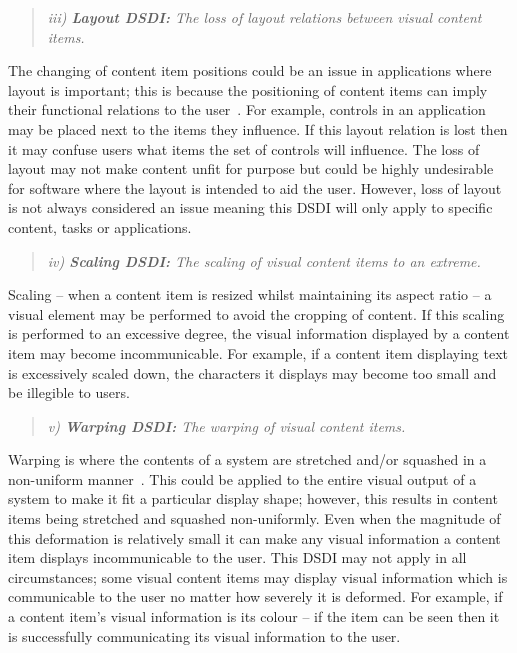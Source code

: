 \documentclass[twocolumn,compsoc]{cvm}
\begin{document}
\begin{quote}\emph{iii) \textbf{Layout \ac{DSDI}:} The loss of layout relations between visual content items.}\end{quote}

The changing of content item positions could be an issue in applications where layout is important; this is because the positioning of content items can imply their functional relations to the user~\cite{Constantine1999,mcnaughton-et-al:hcis2017}.
For example, controls in an application may be placed next to the items they influence.
If this layout relation is lost then it may confuse users what items the set of controls will influence. 
The loss of layout may not make content unfit for purpose but could be highly undesirable for software where the layout is intended to aid the user.
However, loss of layout is not always considered an issue meaning this \ac{DSDI} will only apply to specific content, tasks or applications.

\begin{quote}\emph{iv) \textbf{Scaling \ac{DSDI}:} The scaling of visual content items to an extreme.}\end{quote}

Scaling -- when a content item is resized whilst maintaining its aspect ratio -- a visual element may be performed to avoid the cropping of content.
If this scaling is performed to an excessive degree, the visual information displayed by a content item may become incommunicable.
For example, if a content item displaying text is excessively scaled down, the characters it displays may become too small and be illegible to users.

\begin{quote}\emph{v) \textbf{Warping \ac{DSDI}:} The warping of visual content items.}\end{quote}

Warping is where the contents of a system are stretched and/or squashed in a non-uniform manner~\cite{Milliron2002}.
This could be applied to the entire visual output of a system to make it fit a particular display shape; however, this results in content items being stretched and squashed non-uniformly.
Even when the magnitude of this deformation is relatively small it can make any visual information a content item displays incommunicable to the user.
This \ac{DSDI} may not apply in all circumstances; some visual content items may display visual information which is communicable to the user no matter how severely it is deformed.
For example, if a content item's visual information is its colour -- if the item can be seen then it is successfully communicating its visual information to the user.
\end{document}
